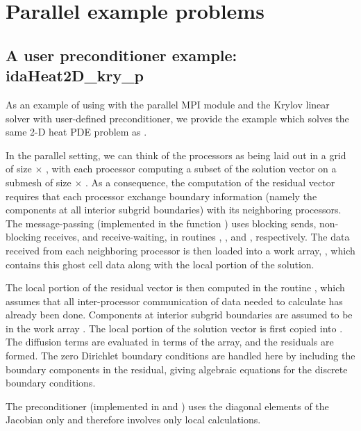 \section{Parallel example problems}\label{s:ex_parallel}

\subsection{A user preconditioner example: idaHeat2D\_kry\_p}\label{ss:idaHeat2D_p}

As an example of using {\ida} with the parallel MPI {\nvecp} module and the Krylov 
linear solver {\idaspgmr} with user-defined preconditioner, we provide the example
 which solves the same 2-D heat PDE problem as . 

In the parallel setting, we can think of the processors as being laid out
in a grid of size  $\times$ , with each processor computing
a subset of the solution vector on a submesh of size  $\times$
.  As a consequence, the computation of the residual
vector requires that each processor exchange boundary information
(namely the components at all interior subgrid boundaries) with its
neighboring processors.  The message-passing (implemented in the
function ) uses blocking sends, non-blocking receives, and
receive-waiting, in routines , , and
, respectively.  The data received from each neighboring
processor is then loaded into a work array, , which contains
this ghost cell data along with the local portion of the solution.

The local portion of the residual vector is then computed in the
routine , which assumes that all inter-processor
communication of data needed to calculate  has already been
done.  Components at interior subgrid boundaries are assumed to be in
the work array .  The local portion of the solution vector
 is first copied into .  The diffusion terms are
evaluated in terms of the  array, and the residuals are
formed.  The zero Dirichlet boundary conditions are handled here by
including the boundary components in the residual, giving algebraic
equations for the discrete boundary conditions.

The preconditioner (implemented in  and ) uses the
diagonal elements of the Jacobian only and therefore involves only local calculations.

